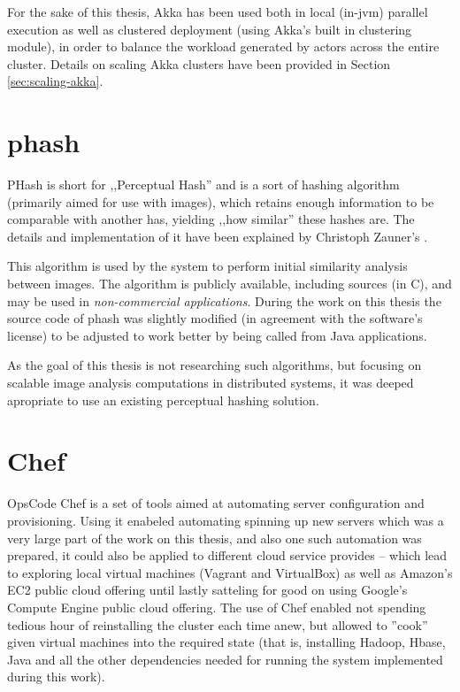For the sake of this thesis, Akka has been used both in local (in-jvm) parallel execution as well as clustered deployment (using Akka's built in clustering module), in order to balance the workload generated by actors across the entire cluster. Details on scaling Akka clusters have been provided in Section \ref{sec:scaling-akka}.

\section{phash}
\label{sec:phash}
PHash is short for ,,Perceptual Hash'' and is a sort of hashing algorithm (primarily aimed for use with images), which retains enough information to be comparable with another has, yielding ,,how similar'' these hashes are. The details and implementation of it have been explained by Christoph Zauner's \cite{phash}.

This algorithm is used by the system to perform initial similarity analysis between images. The algorithm is publicly available, including sources (in C), and may be used in \textit{non-commercial applications}. During the work on this thesis the source code of phash was slightly modified (in agreement with the software's license) to be adjusted to work better by being called from Java applications.

As the goal of this thesis is not researching such algorithms, but focusing on scalable image analysis computations in distributed systems, it was deeped apropriate to use an existing perceptual hashing solution.

\section{Chef}
\label{sec:chef}
OpsCode Chef is a set of tools aimed at automating server configuration and provisioning. Using it enabeled automating spinning up new servers which was a very large part of the work on this thesis, and also one such automation was prepared, it could also be applied to different cloud service provides -- which lead to exploring local virtual machines (Vagrant and VirtualBox) as well as Amazon's EC2 public cloud offering until lastly satteling for good on using Google's Compute Engine public cloud offering. The use of Chef enabled not spending tedious hour of reinstalling the cluster each time anew, but allowed to ''cook'' given virtual machines into the required state (that is, installing Hadoop, Hbase, Java and all the other dependencies needed for running the system implemented during this work).

